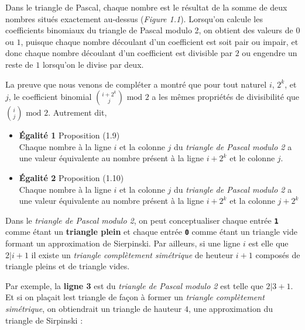 \documentclass[16pt]{report}
\begin{document}
\begin{multicols*}{2}
        \begin{Concept*}{}{}
            Dans le triangle de Pascal, chaque nombre est le résultat de la somme de deux nombres 
            situés exactement au-dessus (\textit{Figure 1.1}). Lorsqu'on calcule les coefficients 
            binomiaux du triangle de Pascal modulo 2, on obtient des valeurs de $0$ ou $1$, puisque chaque 
            nombre découlant d'un coefficient est soit pair ou impair, et donc chaque nombre 
            découlant d'un coefficient est divisible par $2$ ou engendre un reste de $1$ lorsqu'on le divise 
            par deux. 
        \end{Concept*}
        La preuve que nous venons de compléter a montré que pour tout naturel $i$, $2^k$, et $j$, le 
        coefficient binomial ${i  + 2^k \choose j} \text{ mod 2}$ a les mêmes propriétés de divisibilité 
        que ${ i \choose j} \text{ mod 2}$. Autrement dit, 
        
        \begin{itemize}
            \item \textbf{Égalité 1} Proposition (1.9) \\ Chaque nombre à la ligne $i$ et la colonne $j$ 
        du \textit{triangle de Pascal modulo 2} a une valeur équivalente au nombre présent à la ligne
            $i + 2^k$  et le colonne $j$.
            \item \textbf{Égalité 2} Proposition (1.10) \\  Chaque nombre à la ligne $i$ et la colonne $j$ 
        du \textit{triangle de Pascal modulo 2} a une valeur équivalente au nombre présent à la ligne
            $i + 2^k$ et la colonne $j + 2^k$
        \end{itemize} 
        Dans le \textit{triangle de Pascal modulo 2},  on peut conceptualiser chaque entrée \textbf{\texttt{1}} 
        comme étant un \textbf{triangle plein} et chaque entrée \textbf{\texttt{0}} 
        comme étant un triangle vide formant un approximation de Sierpinski.  
        Par ailleurs, si une ligne $i$ est elle que $2|i + 1$  il existe un \textit{triangle complètement simétrique} 
        de heuteur $i + 1$ composés de triangle pleins et de triangle vides.

        Par exemple, la \textbf{ligne 3} est du \textit{triangle de Pascal modulo 2} est telle que 
        $2 | 3 + 1$. Et si on plaçait lest triangle de façon à former un 
        \textit{triangle complètement simétrique}, on obtiendrait un triangle de hauteur $4$, 
        une approximation du triangle de Sirpinski :


\end{multicols*}
\end{document}
